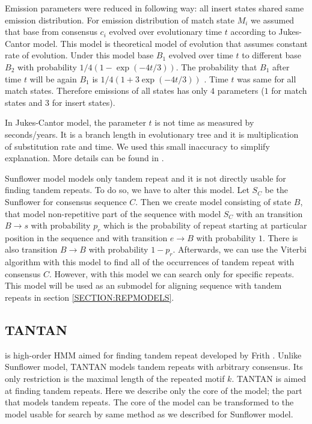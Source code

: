 Emission parameters were reduced in following way: all insert states shared
same emission distribution. For emission distribution of match state $M_i$ we
assumed that base from consensus $c_i$ evolved over evolutionary time $t$
according to Jukes-Cantor model. This model is theoretical model of evolution
that assumes constant rate of evolution. Under this model base $B_1$ evolved
over time $t$ to different base $B_2$  with probability $1/4(1-\exp(-4t/3))$.
The probability that $B_1$ after time $t$ will be again $B_1$ is
$1/4(1+3\exp(-4t/3))$ \cite{Durbin1998}. Time $t$ was same for all match
states. Therefore emissions of all states has only $4$ parameters ($1$ for
match states and $3$ for insert states).

\begin{note}
In Jukes-Cantor model, the parameter $t$ is not time as measured by
seconds/years. It is a branch length in evolutionary tree and it is
multiplication of substitution rate and time. We used this small inaccuracy to
simplify explanation.  More details can be found in \cite{Durbin1998}.

\end{note}

Sunflower model models only tandem repeat and it is not directly usable for
finding tandem repeats. To do so, we have to alter this model. Let $S_C$ be the
Sunflower for consensus sequence $C$. Then we create model consisting of state
$B$, that model non-repetitive part of the sequence with model $S_C$ with an
transition $B\to s$ with probability $p_r$ which is the probability of repeat
starting at particular position in the sequence and with transition $e\to B$
with probability $1$. There is also transition $B\to B$ with probability
$1-p_r$. Afterwards, we can use the Viterbi algorithm with this model to find
all of the occurrences of tandem repeat with consensus $C$. However, with this
model we can search only for specific repeats. This model will be used as an
submodel for aligning sequence with tandem repeats in section
\ref{SECTION:REPMODELS}.


\subsection{TANTAN}

 is high-order HMM aimed for finding tandem repeat developed
by Frith \cite{Frith2011}. Unlike Sunflower model, TANTAN models tandem repeats
with arbitrary consensus. Its only restriction is the maximal length of the
repeated motif $k$. TANTAN is aimed at finding tandem repeats. Here we describe
only the core of the model; the part that models tandem repeats. The core of
the model can be transformed to the model usable for search by same method as
we described for Sunflower model.

